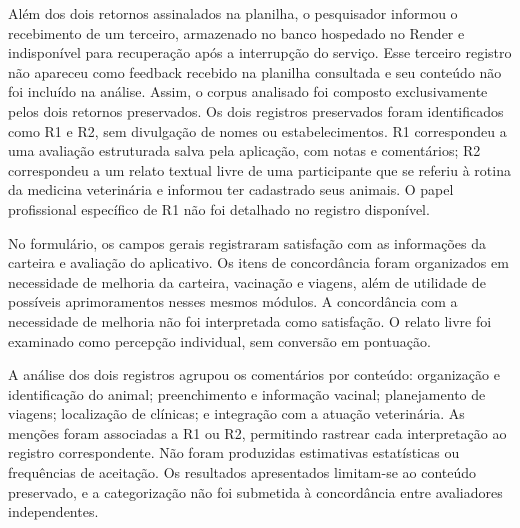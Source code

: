 \documentclass{UNESC}
\begin{document}
Além dos dois retornos assinalados na planilha, o pesquisador informou o recebimento de um terceiro, armazenado no banco hospedado no Render e indisponível para recuperação após a interrupção do serviço. Esse terceiro registro não apareceu como feedback recebido na planilha consultada e seu conteúdo não foi incluído na análise. Assim, o corpus analisado foi composto exclusivamente pelos dois retornos preservados. Os dois registros preservados foram identificados como R1 e R2, sem divulgação de nomes ou estabelecimentos. R1 correspondeu a uma avaliação estruturada salva pela aplicação, com notas e comentários; R2 correspondeu a um relato textual livre de uma participante que se referiu à rotina da medicina veterinária e informou ter cadastrado seus animais. O papel profissional específico de R1 não foi detalhado no registro disponível.

No formulário, os campos gerais registraram satisfação com as informações da carteira e avaliação do aplicativo. Os itens de concordância foram organizados em necessidade de melhoria da carteira, vacinação e viagens, além de utilidade de possíveis aprimoramentos nesses mesmos módulos. A concordância com a necessidade de melhoria não foi interpretada como satisfação. O relato livre foi examinado como percepção individual, sem conversão em pontuação.

A análise dos dois registros agrupou os comentários por conteúdo: organização e identificação do animal; preenchimento e informação vacinal; planejamento de viagens; localização de clínicas; e integração com a atuação veterinária. As menções foram associadas a R1 ou R2, permitindo rastrear cada interpretação ao registro correspondente. Não foram produzidas estimativas estatísticas ou frequências de aceitação. Os resultados apresentados limitam-se ao conteúdo preservado, e a categorização não foi submetida à concordância entre avaliadores independentes.

\begingroup
\makeatletter
{}
\makeatother
\end{document}
